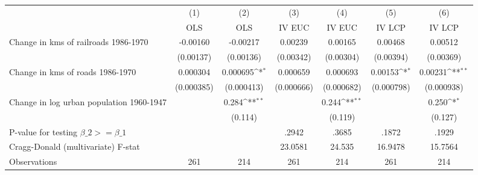{
\def\sym#1{\ifmmode^{#1}\else\(^{#1}\)\fi}
\begin{tabular}{l*{6}{c}}
\hline\hline
                &\multicolumn{1}{c}{(1)}&\multicolumn{1}{c}{(2)}&\multicolumn{1}{c}{(3)}&\multicolumn{1}{c}{(4)}&\multicolumn{1}{c}{(5)}&\multicolumn{1}{c}{(6)}\\
                &\multicolumn{1}{c}{OLS}&\multicolumn{1}{c}{OLS}&\multicolumn{1}{c}{IV EUC}&\multicolumn{1}{c}{IV EUC}&\multicolumn{1}{c}{IV LCP}&\multicolumn{1}{c}{IV LCP}\\
\hline
Change in kms of railroads 1986-1970& -0.00160         & -0.00217         &  0.00239         &  0.00165         &  0.00468         &  0.00512         \\
                &(0.00137)         &(0.00136)         &(0.00342)         &(0.00304)         &(0.00394)         &(0.00369)         \\
[1em]
Change in kms of roads 1986-1970& 0.000304         & 0.000695\sym{*}  & 0.000659         & 0.000693         &  0.00153\sym{*}  &  0.00231\sym{**} \\
                &(0.000385)         &(0.000413)         &(0.000666)         &(0.000682)         &(0.000798)         &(0.000938)         \\
[1em]
Change in log urban population 1960-1947&                  &    0.284\sym{**} &                  &    0.244\sym{**} &                  &    0.250\sym{*}  \\
                &                  &  (0.114)         &                  &  (0.119)         &                  &  (0.127)         \\
\hline
P-value for testing $\beta\_{2} >= \beta\_{1}$&                  &                  &    .2942         &    .3685         &    .1872         &    .1929         \\
Cragg-Donald (multivariate) F-stat&                  &                  &  23.0581         &   24.535         &  16.9478         &  15.7564         \\
Observations    &      261         &      214         &      261         &      214         &      261         &      214         \\
\hline\hline
\end{tabular}
}
